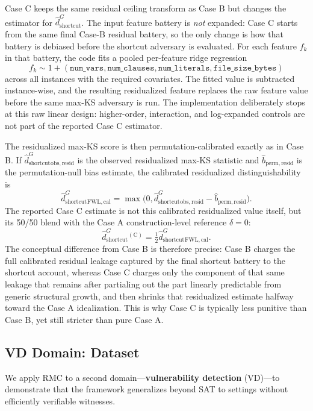 \documentclass[conference]{IEEEtran}
\theoremstyle{remark}
\newcommand{\hatshortcutDisc}{\hat d_{\mathrm{shortcut}}^{G}}
\begin{document}
Case C keeps the same residual ceiling transform as Case B but changes the estimator for $\hatshortcutDisc$.
The input feature battery is \emph{not} expanded: Case C starts from the same final Case-B residual battery, so the only change is how that battery is debiased before the shortcut adversary is evaluated.
For each feature $f_k$ in that battery, the code fits a pooled per-feature ridge regression
\[
f_k \sim 1 + (\texttt{num\_vars},\texttt{num\_clauses},\texttt{num\_literals},\texttt{file\_size\_bytes})
\]
across all instances with the required covariates.
The fitted value is subtracted instance-wise, and the resulting residualized feature replaces the raw feature value before the same max-KS adversary is run.
The implementation deliberately stops at this raw linear design: higher-order, interaction, and log-expanded controls are not part of the reported Case C estimator.

The residualized max-KS score is then permutation-calibrated exactly as in Case B.
If $\hatshortcutDisc_{\mathrm{obs,resid}}$ is the observed residualized max-KS statistic and $\hat b_{\mathrm{perm,resid}}$ is the permutation-null bias estimate, the calibrated residualized distinguishability is
\[
\hatshortcutDisc_{\mathrm{FWL,cal}}
=
\max\!\bigl(0,\hatshortcutDisc_{\mathrm{obs,resid}}-\hat b_{\mathrm{perm,resid}}\bigr).
\]
The reported Case C estimate is not this calibrated residualized value itself, but its 50/50 blend with the Case A construction-level reference $\delta=0$:
\[
\hatshortcutDisc^{(\mathrm{C})}
=
\tfrac{1}{2}\hatshortcutDisc_{\mathrm{FWL,cal}}.
\]
The conceptual difference from Case B is therefore precise: Case B charges the full calibrated residual leakage captured by the final shortcut battery to the shortcut account, whereas Case C charges only the component of that same leakage that remains after partialing out the part linearly predictable from generic structural growth, and then shrinks that residualized estimate halfway toward the Case A idealization.  This is why Case C is typically less punitive than Case B, yet still stricter than pure Case A.

\subsection{VD Domain: Dataset}
\label{sec:vd_dataset}

We apply RMC to a second domain---\textbf{vulnerability detection} (VD)---to demonstrate that the framework generalizes beyond SAT to settings without efficiently verifiable witnesses.
\end{document}
